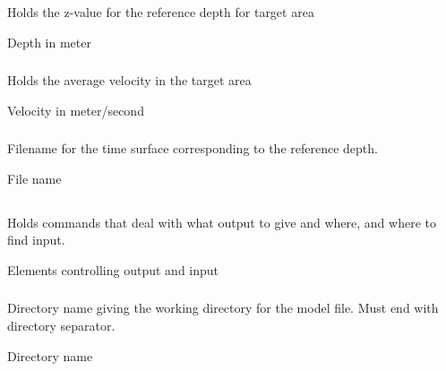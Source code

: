 \subsubsection{} 
 \slist
   \item \Description Holds the z-value for the reference depth for target area
   \item \Argument Depth in meter
   \item \Default
\elist

\subsubsection{} 
 \slist
   \item \Description Holds the average velocity in the target area
   \item \Argument Velocity in meter/second
   \item \Default
\elist

\subsubsection{} 
 \slist
   \item \Description Filename for the time surface corresponding to the reference depth.
   \item \Argument File name
   \item \Default
\elist

\subsection{} 
 \slist
   \item \Description Holds commands that deal with what output to give and where, and where to find input.
   \item \Argument Elements controlling output and input
   \item \Default
 \elist

\subsubsection{} 
 \slist
   \item \Description Directory name giving the working directory for the model file. Must end with directory separator.
   \item \Argument Directory name
   \item \Default
 \elist

